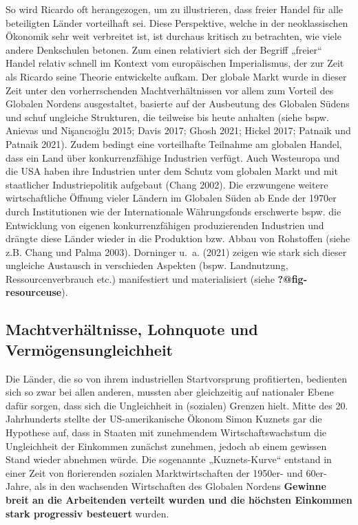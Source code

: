\documentclass[
  nswissgerman,
  a4paper,
  DIV=11,
  numbers=noendperiod,
  oneside,
  openany]{scrreprt}
\begin{document}
So wird Ricardo oft herangezogen, um zu illustrieren, dass freier Handel
für alle beteiligten Länder vorteilhaft sei. Diese Perspektive, welche
in der neoklassischen Ökonomik sehr weit verbreitet ist, ist durchaus
kritisch zu betrachten, wie viele andere Denkschulen betonen. Zum einen
relativiert sich der Begriff „freier`` Handel relativ schnell im Kontext
vom europäischen Imperialismus, der zur Zeit als Ricardo seine Theorie
entwickelte aufkam. Der globale Markt wurde in dieser Zeit unter den
vorherrschenden Machtverhältnissen vor allem zum Vorteil des Globalen
Nordens ausgestaltet, basierte auf der Ausbeutung des Globalen Südens
und schuf ungleiche Strukturen, die teilweise bis heute anhalten (siehe
bspw. Anievas und Nişancıoğlu 2015; Davis 2017; Ghosh 2021; Hickel 2017;
Patnaik und Patnaik 2021). Zudem bedingt eine vorteilhafte Teilnahme am
globalen Handel, dass ein Land über konkurrenzfähige Industrien verfügt.
Auch Westeuropa und die USA haben ihre Industrien unter dem Schutz vom
globalen Markt und mit staatlicher Industriepolitik aufgebaut (Chang
2002). Die erzwungene weitere wirtschaftliche Öffnung vieler Ländern im
Globalen Süden ab Ende der 1970er durch Institutionen wie der
Internationale Währungsfonds erschwerte bspw. die Entwicklung von
eigenen konkurrenzfähigen produzierenden Industrien und drängte diese
Länder wieder in die Produktion bzw. Abbau von Rohstoffen (siehe z.B.
Chang und Palma 2003). Dorninger u.~a. (2021) zeigen wie stark sich
dieser ungleiche Austausch in verschieden Aspekten (bspw. Landnutzung,
Ressourcenverbrauch etc.) manifestiert und materialisiert (siehe
\textbf{?@fig-resourceuse}).

\subsection{Machtverhältnisse, Lohnquote und
Vermögensungleichheit}\label{machtverhuxe4ltnisse-lohnquote-und-vermuxf6gensungleichheit}

Die Länder, die so von ihrem industriellen Startvorsprung profitierten,
bedienten sich so zwar bei allen anderen, mussten aber gleichzeitig auf
nationaler Ebene dafür sorgen, dass sich die Ungleichheit in (sozialen)
Grenzen hielt. Mitte des 20. Jahrhunderts stellte der US-amerikanische
Ökonom Simon Kuznets gar die Hypothese auf, dass in Staaten mit
zunehmendem Wirtschaftswachstum die Ungleichheit der Einkommen zunächst
zunehmen, jedoch ab einem gewissen Stand wieder abnehmen würde. Die
sogenannte „Kuznets-Kurve`` entstand in einer Zeit von florierenden
sozialen Marktwirtschaften der 1950er- und 60er-Jahre, als in den
wachsenden Wirtschaften des Globalen Nordens \textbf{Gewinne breit an
die Arbeitenden verteilt wurden und die höchsten Einkommen stark
progressiv besteuert} wurden.
\end{document}
